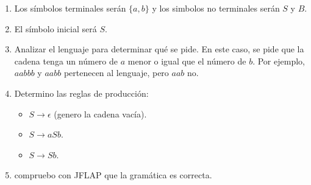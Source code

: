 \documentclass{article}
\begin{document}
        \begin{flushleft}
            \begin{enumerate}
                \item Los símbolos terminales serán $\{a,b\}$ y los simbolos no terminales serán $S$ y $B$.
                \item El símbolo inicial será $S$.
                \item Analizar el lenguaje para determinar qué se pide. En este caso, se pide que la cadena tenga un número de $a$ menor o igual que el número de $b$. Por ejemplo, $aabbb$ y $aabb$ pertenecen al lenguaje, pero $aab$ no.
                \item Determino las reglas de producción:
                \begin{itemize}
                    \item $S \rightarrow \epsilon$ (genero la cadena vacía).
                    \item $S \rightarrow aSb$.
                    \item $S \rightarrow Sb$.
                \end{itemize}

                \item compruebo con JFLAP que la gramática es correcta.
                
                \vspace{\baselineskip} %


\end{enumerate}
\end{flushleft}
\end{document}
